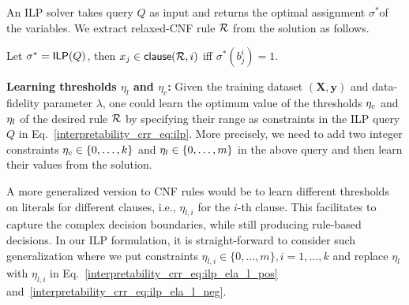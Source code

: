 An ILP solver takes  query  $ Q $ as input and returns the optimal assignment $ \sigma^* $of the variables.
We extract relaxed-CNF rule ${\mathcal{R}}$ from the solution  as follows. 


\begin{construction}
	\label{interpretability_crr_cons:rule}
	Let $\sigma^* = \mathsf{ILP}(Q)$, then $x_j \in {\ensuremath{\mathsf{clause}}(\ensuremath{{\mathcal{R}}},i)}$ iff $\sigma^*(b_{j}^i) = 1$.
\end{construction}






\textbf{Learning thresholds $ \eta_l $ and $ \eta_c $:}
Given the training dataset $ (\mathbf{X}, \mathbf{y})$ and data-fidelity parameter $ \lambda $, one could learn the optimum value of the thresholds $ \eta_{c} $ and $ \eta_l $ of the desired rule $ {\mathcal{R}} $  by specifying their range as constraints in the ILP query $ Q $ in Eq.~\ref{interpretability_crr_eq:ilp}. More precisely, we need to add two integer constraints  $ \eta_c  \in \{0,\dots,k\}$ and $ \eta_l \in \{0,\dots,m\} $ in the above query and then learn their values from the solution.  

A more generalized version to CNF rules would be to learn different thresholds on literals for different clauses, i.e., $ \eta_{l,i} $ for the $ i $-th clause. This facilitates to capture the complex decision boundaries, while still producing rule-based decisions. 
In our ILP formulation, it is straight-forward to consider such generalization where we put constraints $ \eta_{l,i} \in \{0,\dots,m\}, i=1,\dots, k $ and replace
 $ \eta_l $ with $ \eta_{l,i} $ in Eq.~\ref{interpretability_crr_eq:ilp_ela_l_pos} and~\ref{interpretability_crr_eq:ilp_ela_l_neg}. 



